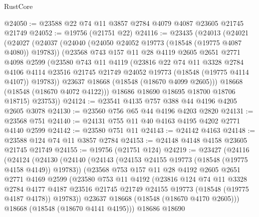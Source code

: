 \begin{lexlean}{RustCore}
\begin{coremodule}
@24050 := @23588 @22 @74 @11 @3857 @2784 @4079 @4087 @23605 @21745 @21749
@24052 := @19756 (@21751 @22)
@24116 := @23435
    (@24013
      (@24021
        (@24027
          (@24037
            (@24040 (@24050 @24052 @19773 (@18548 (@19775 @4087 @4080)) @19783))
            (@23568
              @743
              @157
              @11
              @28
              @4119
              @2605
              @2651
              @2771
              @4098
              @2599
              (@23580
                @743
                @11
                @4119
                (@23816
                  @22
                  @74
                  @11
                  @3328
                  @2784
                  @4106
                  @4114
                  @23516
                  @21745
                  @21749
                  @24052
                  @19773
                  (@18548 (@19775 @4114 @4107))
                  @19783))
              @23637
              @18668
              (@18548 (@18670 @4099 @2605)))
            @18668
            (@18548 (@18670 @4072 @4122)))
          @18686
          @18690
          @18695
          @18700
          @18706
          @18715)
        @23753))
@24124 := @23541 @4135 @757 @388 @44 @4196 @4205 @2605 @3078
@24130 := @23560 @756 @65 @44 @4196 @4203 @2820
@24131 := @23568 @751
@24140 := @24131 @755 @11 @40 @4163 @4195 @4202 @2771 @4140 @2599
@24142 := @23580 @751 @11
@24143 := @24142 @4163
@24148 := @23588 @124 @74 @11 @3857 @2784
@24153 := @24148 @4148 @4158 @23605 @21745 @21749
@24155 := @19756 (@21751 @124)
@24219 := @23427
    (@24116
      (@24124
        (@24130
          (@24140
            (@24143 (@24153 @24155 @19773 (@18548 (@19775 @4158 @4149)) @19783))
            (@23568
              @753
              @157
              @11
              @28
              @4192
              @2605
              @2651
              @2771
              @4169
              @2599
              (@23580
                @753
                @11
                @4192
                (@23816
                  @124
                  @74
                  @11
                  @3328
                  @2784
                  @4177
                  @4187
                  @23516
                  @21745
                  @21749
                  @24155
                  @19773
                  (@18548 (@19775 @4187 @4178))
                  @19783))
              @23637
              @18668
              (@18548 (@18670 @4170 @2605)))
            @18668
            (@18548 (@18670 @4141 @4195)))
          @18686
          @18690

\end{coremodule}
\end{lexlean}
